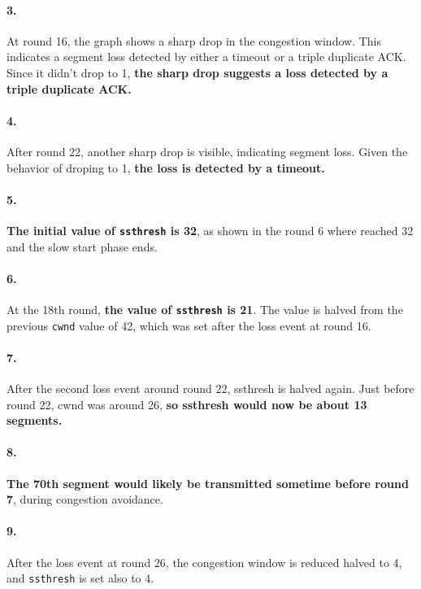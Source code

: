 \documentclass{cshwk}
\begin{document}
\paragraph{3.} At round 16, the graph shows a sharp drop in the congestion window. This indicates a segment loss detected by either a timeout or a triple duplicate ACK. Since it didn't drop to 1, \textbf{the sharp drop suggests a loss detected by a triple duplicate ACK.}

\paragraph{4.} After round 22, another sharp drop is visible, indicating segment loss. Given the behavior of droping to 1, \textbf{the loss is detected by a timeout.}

\paragraph{5.} \textbf{The initial value of \texttt{ssthresh} is 32}, as shown in the round 6 where reached 32 and the slow start phase ends.

\paragraph{6.} At the 18th round, \textbf{the value of \texttt{ssthresh} is 21}. The value is halved from the previous \texttt{cwnd} value of 42, which was set after the loss event at round 16.

\paragraph{7.} After the second loss event around round 22, ssthresh is halved again. Just before round 22, cwnd was around 26, \textbf{so ssthresh would now be about 13 segments.}

\paragraph{8.} \textbf{The 70th segment would likely be transmitted sometime before round 7}, during congestion avoidance.

\paragraph{9.} After the loss event at round 26, the congestion window is reduced halved to 4, and \texttt{ssthresh} is set also to 4.
\end{document}
